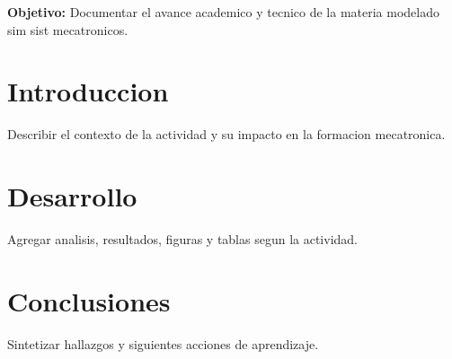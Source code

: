 \documentclass[spanish,letterpaper,oneside]{article}
\begin{document}
\templatePortrait
\templatePagecfg
\onehalfspacing

\begin{abstractd}
\textbf{Objetivo:} Documentar el avance academico y tecnico de la materia modelado sim sist mecatronicos.
\end{abstractd}

\templateIndex
\templateFinalcfg

\section{Introduccion}
Describir el contexto de la actividad y su impacto en la formacion mecatronica.

\section{Desarrollo}
Agregar analisis, resultados, figuras y tablas segun la actividad.

\section{Conclusiones}
Sintetizar hallazgos y siguientes acciones de aprendizaje.



\end{document}
